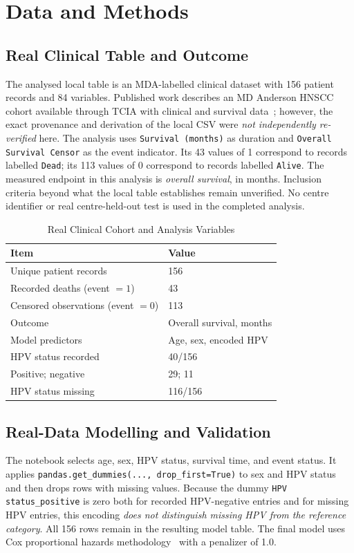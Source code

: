 \documentclass[conference]{IEEEtran}
\begin{document}
\section{Data and Methods}
\subsection{Real Clinical Table and Outcome}
The analysed local table is an MDA-labelled clinical dataset with 156 patient records and 84 variables. Published work describes an MD Anderson HNSCC cohort available through TCIA with clinical and survival data~\cite{grossberg2018}; however, the exact provenance and derivation of the local CSV were \emph{not independently re-verified} here. The analysis uses \texttt{Survival (months)} as duration and \texttt{Overall Survival Censor} as the event indicator. Its 43 values of 1 correspond to records labelled \texttt{Dead}; its 113 values of 0 correspond to records labelled \texttt{Alive}. The measured endpoint in this analysis is \emph{overall survival}, in months. Inclusion criteria beyond what the local table establishes remain unverified. No centre identifier or real centre-held-out test is used in the completed analysis.

\begin{table}[t]
\caption{Real Clinical Cohort and Analysis Variables}
\label{tab:cohort}
\centering
\footnotesize
\begin{tabular}{@{}p{}p{}@{}}
\toprule
Item & Value \\
\midrule
Unique patient records & 156 \\
Recorded deaths (event $=1$) & 43 \\
Censored observations (event $=0$) & 113 \\
Outcome & Overall survival, months \\
Model predictors & Age, sex, encoded HPV \\
HPV status recorded & 40/156 \\
\quad Positive; negative & 29; 11 \\
HPV status missing & 116/156 \\
\bottomrule
\end{tabular}
\end{table}

\subsection{Real-Data Modelling and Validation}
The notebook selects age, sex, HPV status, survival time, and event status. It applies \texttt{pandas.get\_dummies(..., drop\_first=True)} to sex and HPV status and then drops rows with missing values. Because the dummy \texttt{HPV status\_positive} is zero both for recorded HPV-negative entries and for missing HPV entries, this encoding \emph{does not distinguish missing HPV from the reference category}. All 156 rows remain in the resulting model table. The final model uses Cox proportional hazards methodology~\cite{cox1972} with a penalizer of 1.0.
\end{document}
